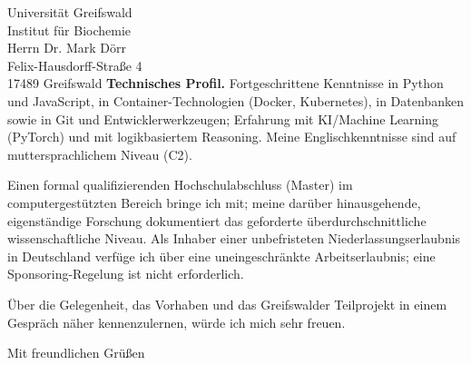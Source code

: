 \documentclass[11pt,a4paper]{letter}
\begin{document}
\begin{letter}{%
  Universität Greifswald \\
  Institut für Biochemie \\
  Herrn Dr. Mark Dörr \\
  Felix-Hausdorff-Straße 4 \\
  17489 Greifswald%
}
\textbf{Technisches Profil.} Fortgeschrittene Kenntnisse in Python und JavaScript, in
Container-Technologien (Docker, Kubernetes), in Datenbanken sowie in Git und
Entwicklerwerkzeugen; Erfahrung mit KI/Machine Learning (PyTorch) und mit logikbasiertem
Reasoning. Meine Englischkenntnisse sind auf muttersprachlichem Niveau (C2).

Einen formal qualifizierenden Hochschulabschluss (Master) im computergestützten Bereich
bringe ich mit; meine darüber hinausgehende, eigenständige Forschung dokumentiert das
geforderte überdurchschnittliche wissenschaftliche Niveau. Als Inhaber einer
unbefristeten Niederlassungserlaubnis in Deutschland verfüge ich über eine
uneingeschränkte Arbeitserlaubnis; eine Sponsoring-Regelung ist nicht erforderlich.

Über die Gelegenheit, das Vorhaben und das Greifswalder Teilprojekt in einem Gespräch
näher kennenzulernen, würde ich mich sehr freuen.

\closing{Mit freundlichen Grüßen}

\end{letter}
\end{document}
